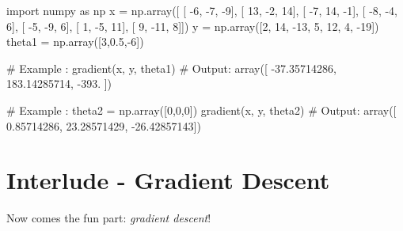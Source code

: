 \documentclass[]{article}
\newenvironment{Shaded}{\begin{snugshade}}{\end{snugshade}}
\newcommand{\CommentTok}[1]{\textcolor[rgb]{0.48,0.49,0.49}{#1}}
\newcommand{\DecValTok}[1]{\textcolor[rgb]{0.96,0.45,0.00}{#1}}
\newcommand{\FloatTok}[1]{\textcolor[rgb]{0.96,0.45,0.00}{#1}}
\newcommand{\ImportTok}[1]{\textcolor[rgb]{0.15,0.68,0.38}{#1}}
\newcommand{\NormalTok}[1]{\textcolor[rgb]{0.81,0.81,0.76}{#1}}
\newcommand{\OperatorTok}[1]{\textcolor[rgb]{0.81,0.81,0.76}{#1}}
\begin{document}
\begin{Shaded}
\begin{Highlighting}[]
\ImportTok{import}\NormalTok{ numpy }\ImportTok{as}\NormalTok{ np}
\NormalTok{x }\OperatorTok{=}\NormalTok{ np.array([}
\NormalTok{          [ }\DecValTok{-6}\NormalTok{,  }\DecValTok{-7}\NormalTok{,  }\DecValTok{-9}\NormalTok{],}
\NormalTok{        [ }\DecValTok{13}\NormalTok{,  }\DecValTok{-2}\NormalTok{,  }\DecValTok{14}\NormalTok{],}
\NormalTok{        [ }\DecValTok{-7}\NormalTok{,  }\DecValTok{14}\NormalTok{,  }\DecValTok{-1}\NormalTok{],}
\NormalTok{        [ }\DecValTok{-8}\NormalTok{,  }\DecValTok{-4}\NormalTok{,   }\DecValTok{6}\NormalTok{],}
\NormalTok{        [ }\DecValTok{-5}\NormalTok{,  }\DecValTok{-9}\NormalTok{,   }\DecValTok{6}\NormalTok{],}
\NormalTok{        [  }\DecValTok{1}\NormalTok{,  }\DecValTok{-5}\NormalTok{,  }\DecValTok{11}\NormalTok{],}
\NormalTok{        [  }\DecValTok{9}\NormalTok{, }\DecValTok{-11}\NormalTok{,   }\DecValTok{8}\NormalTok{]])}
\NormalTok{y }\OperatorTok{=}\NormalTok{ np.array([}\DecValTok{2}\NormalTok{, }\DecValTok{14}\NormalTok{, }\DecValTok{-13}\NormalTok{, }\DecValTok{5}\NormalTok{, }\DecValTok{12}\NormalTok{, }\DecValTok{4}\NormalTok{, }\DecValTok{-19}\NormalTok{])}
\NormalTok{theta1 }\OperatorTok{=}\NormalTok{ np.array([}\DecValTok{3}\NormalTok{,}\FloatTok{0.5}\NormalTok{,}\OperatorTok{-}\DecValTok{6}\NormalTok{])}

\CommentTok{# Example :}
\NormalTok{gradient(x, y, theta1)}
\CommentTok{# Output:}
\NormalTok{array([ }\FloatTok{-37.35714286}\NormalTok{,  }\FloatTok{183.14285714}\NormalTok{, }\FloatTok{-393.}\NormalTok{        ])}

\CommentTok{# Example :}
\NormalTok{theta2 }\OperatorTok{=}\NormalTok{ np.array([}\DecValTok{0}\NormalTok{,}\DecValTok{0}\NormalTok{,}\DecValTok{0}\NormalTok{])}
\NormalTok{gradient(x, y, theta2)}
\CommentTok{# Output:}
\NormalTok{array([  }\FloatTok{0.85714286}\NormalTok{,  }\FloatTok{23.28571429}\NormalTok{, }\FloatTok{-26.42857143}\NormalTok{])}
\end{Highlighting}
\end{Shaded}

\clearpage

\hypertarget{interlude---gradient-descent-1}{%
\section{Interlude - Gradient
Descent}\label{interlude---gradient-descent-1}}

Now comes the fun part: \emph{gradient descent}!
\end{document}
